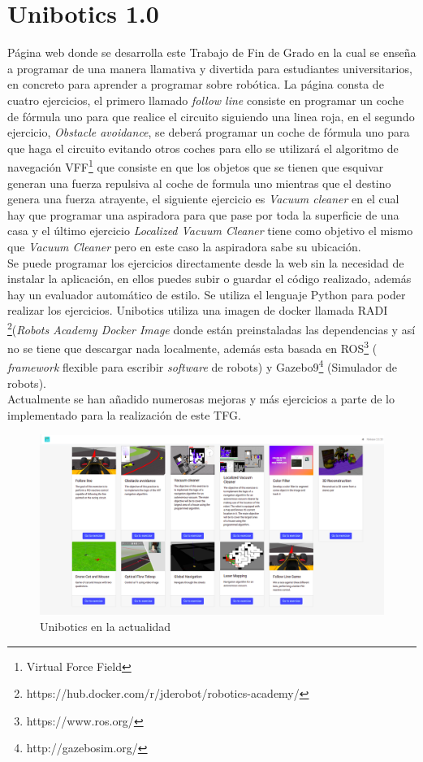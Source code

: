\section{Unibotics 1.0}

Página web donde se desarrolla este Trabajo de Fin  de Grado en la cual se enseña a programar de una manera llamativa y divertida para estudiantes universitarios, en concreto para aprender a programar sobre robótica. La página consta de cuatro ejercicios, el primero llamado \textit{follow line} consiste en programar un coche de fórmula uno para que realice el circuito siguiendo una linea roja, en el segundo ejercicio, \textit{Obstacle avoidance}, se deberá programar un coche de fórmula uno para que haga el circuito evitando otros coches para ello se utilizará el algoritmo de navegación VFF\footnote{Virtual Force Field} que consiste en que los objetos que se tienen que esquivar generan una fuerza repulsiva al coche de formula uno mientras que el destino genera una fuerza atrayente, el siguiente ejercicio es \textit{Vacuum cleaner} en el cual hay que programar una aspiradora para que pase por toda la superficie de una casa y el último ejercicio \textit{Localized Vacuum Cleaner} tiene como objetivo el mismo que \textit{Vacuum Cleaner} pero en este caso la aspiradora sabe su ubicación.\\

\newpage
Se puede programar los ejercicios directamente desde la web sin la necesidad de instalar la aplicación, en ellos puedes subir o guardar el código realizado, además hay un evaluador automático de estilo. Se utiliza el lenguaje Python para poder realizar los ejercicios. Unibotics utiliza una imagen de docker llamada RADI \footnote{https://hub.docker.com/r/jderobot/robotics-academy/}(\textit{Robots Academy Docker Image} donde están preinstaladas las dependencias y así no se tiene que descargar nada localmente, además esta basada en ROS\footnote{https://www.ros.org/} ( \textit{framework} flexible para escribir \textit{software} de robots) y Gazebo9\footnote{http://gazebosim.org/} (Simulador de robots).\cite{robotics}\\

Actualmente se han añadido numerosas mejoras y más ejercicios a parte de lo implementado para la realización de este TFG.

\begin{figure}[H]
    \centering
    \includegraphics[width=15cm, keepaspectratio]{img/unibotics.png}
    \caption{Unibotics en la actualidad}
    \label{fig:unibotics}
\end{figure}